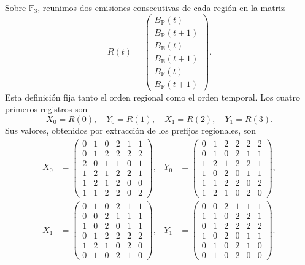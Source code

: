 Sobre \(\mathbb F_3\), reunimos dos emisiones consecutivas de cada región
en la matriz
\begin{equation}
 R(t)=
 \begin{pmatrix}
 B_{\mathrm P}(t)\\ B_{\mathrm P}(t+1)\\
 B_{\mathrm E}(t)\\ B_{\mathrm E}(t+1)\\
 B_{\mathrm F}(t)\\ B_{\mathrm F}(t+1)
 \end{pmatrix}.
 \label{act21:eq:df-registro-matricial}
\end{equation}
Esta definición fija tanto el orden regional como el orden temporal. Los
cuatro primeros registros son
\[
 X_0=R(0),\quad Y_0=R(1),\quad X_1=R(2),\quad Y_1=R(3).
\]
Sus valores, obtenidos por extracción de los prefijos regionales, son
\begin{align*}
 X_0&=\begin{pmatrix}
0&1&0&2&1&1\\0&1&2&2&2&2\\2&0&1&1&0&1\\
1&2&1&2&2&1\\1&2&1&2&0&0\\1&1&2&2&0&2
\end{pmatrix},&
 Y_0&=\begin{pmatrix}
0&1&2&2&2&2\\0&1&0&2&1&1\\1&2&1&2&2&1\\
1&0&2&0&1&1\\1&1&2&2&0&2\\1&2&1&0&2&0
\end{pmatrix},\\[1ex]
 X_1&=\begin{pmatrix}
0&1&0&2&1&1\\0&0&2&1&1&1\\1&0&2&0&1&1\\
0&1&2&2&2&2\\1&2&1&0&2&0\\0&1&0&2&1&0
\end{pmatrix},&
 Y_1&=\begin{pmatrix}
0&0&2&1&1&1\\1&1&0&2&2&1\\0&1&2&2&2&2\\
1&0&2&0&1&1\\0&1&0&2&1&0\\0&1&0&2&0&0
\end{pmatrix}.
\end{align*}

